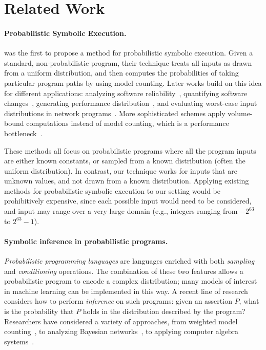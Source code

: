\section{Related Work}
\label{sec:related}


\paragraph*{Probabilistic Symbolic Execution.}
\citet{geldenhuys_2012} was the first to propose a method for probabilistic
symbolic execution. Given a standard, non-probabilistic program, their
technique treats all inputs as drawn from a uniform distribution, and then
computes the probabilities of taking particular program paths by using model
counting. Later works build on this idea for different applications: analyzing
software reliability~\citep{filieri_2013, borges_2014}, quantifying software
changes~\citep{filieri_2015}, generating performance
distribution~\citep{bihuan_2016}, and evaluating worst-case input distributions
in network programs~\citep{p4wn_2021}. More sophisticated schemes apply
volume-bound computations instead of model counting, which is a performance
bottleneck~\citep{sankaranarayanan_2013,DBLP:journals/pacmpl/AlbarghouthiDDN17}.

These methods all focus on probabilistic programs where all the program inputs
are either known constants, or sampled from a known distribution (often the
uniform distribution). In contrast, our technique works for inputs that are
unknown values, and not drawn from a known distribution. Applying existing
methods for probabilistic symbolic execution to our setting would be
prohibitively expensive, since each possible input would need to be considered,
and input may range over a very large domain (e.g., integers ranging from
$-2^{63}$ to $2^{63}-1$).

\paragraph*{Symbolic inference in probabilistic programs.}
\emph{Probabilistic programming languages} are languages enriched with both
\emph{sampling} and \emph{conditioning} operations. The combination of these two
features allows a probabilistic program to encode a complex distribution; many
models of interest in machine learning can be implemented in this way. A recent
line of research considers how to perform \emph{inference} on such programs:
given an assertion $P$, what is the probability that $P$ holds in the
distribution described by the program? Researchers have considered a variety of
approaches, from weighted model counting~\citep{holtzen_2020}, to analyzing
Bayesian networks~\citep{sampson_2014}, to applying computer algebra
systems~\citep{claret_2013, psi_2016, lambda_psi_2020}.

